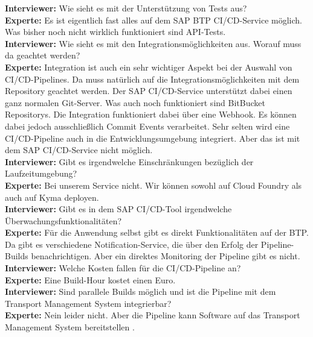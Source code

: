 \begin{linenumbers}
\textbf{Interviewer:} Wie sieht es mit der Unterstützung von Tests aus?\\
\textbf{Experte:} Es ist eigentlich fast alles auf dem SAP BTP CI/CD-Service möglich. Was bisher noch nicht wirklich funktioniert sind API-Tests.\\
\textbf{Interviewer:} Wie sieht es mit den Integrationsmöglichkeiten aus. Worauf muss da geachtet werden?\\
\textbf{Experte:} Integration ist auch ein sehr wichtiger Aspekt bei der Auswahl von CI/CD-Pipelines. Da muss natürlich auf die Integrationsmöglichkeiten mit dem Repository geachtet werden. Der SAP CI/CD-Service unterstützt dabei einen ganz normalen Git-Server. Was auch noch funktioniert sind BitBucket Repositorys. Die Integration funktioniert dabei über eine Webhook. Es können dabei jedoch ausschließlich Commit Events verarbeitet. Sehr selten wird eine CI/CD-Pipeline auch in die Entwicklungsumgebung integriert. Aber das ist mit dem SAP CI/CD-Service nicht möglich.\\
\textbf{Interviewer:} Gibt es irgendwelche Einschränkungen bezüglich der Laufzeitumgebung?\\
\textbf{Experte:} Bei unserem Service nicht. Wir können sowohl auf Cloud Foundry als auch auf Kyma deployen.\\
\textbf{Interviewer:} Gibt es in dem SAP CI/CD-Tool irgendwelche Überwachungsfunktionalitäten?\\ 
\textbf{Experte:} Für die Anwendung selbst gibt es direkt Funktionalitäten auf der BTP. Da gibt es verschiedene Notification-Service, die über den Erfolg der Pipeline-Builds benachrichtigen. Aber ein direktes Monitoring der Pipeline gibt es nicht.\\
\textbf{Interviewer:} Welche Kosten fallen für die CI/CD-Pipeline an?\\
\textbf{Experte:} Eine Build-Hour kostet einen Euro.\\
\textbf{Interviewer:} Sind parallele Builds möglich und ist die Pipeline mit dem Transport Management System integrierbar?\\
\textbf{Experte:} Nein leider nicht. Aber die Pipeline kann Software auf das Transport Management System bereitstellen \cite{ProductOwnerSAPBTPProd&Infra.}.\\
\end{linenumbers}
\newpage
\resetlinenumber
